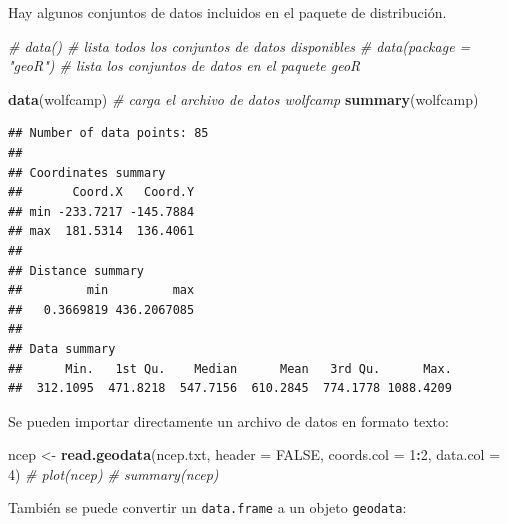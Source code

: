 \documentclass[
]{book}
\newenvironment{Shaded}{\begin{snugshade}}{\end{snugshade}}
\newcommand{\AttributeTok}[1]{\textcolor[rgb]{0.13,0.29,0.53}{#1}}
\newcommand{\CommentTok}[1]{\textcolor[rgb]{0.56,0.35,0.01}{\textit{#1}}}
\newcommand{\ConstantTok}[1]{\textcolor[rgb]{0.56,0.35,0.01}{#1}}
\newcommand{\DecValTok}[1]{\textcolor[rgb]{0.00,0.00,0.81}{#1}}
\newcommand{\FunctionTok}[1]{\textcolor[rgb]{0.13,0.29,0.53}{\textbf{#1}}}
\newcommand{\NormalTok}[1]{#1}
\newcommand{\OtherTok}[1]{\textcolor[rgb]{0.56,0.35,0.01}{#1}}
\newcommand{\SpecialCharTok}[1]{\textcolor[rgb]{0.81,0.36,0.00}{\textbf{#1}}}
\newcommand{\StringTok}[1]{\textcolor[rgb]{0.31,0.60,0.02}{#1}}
\theoremstyle{break}
\theoremstyle{definition}
\theoremstyle{definition}
\theoremstyle{definition}
\theoremstyle{definition}
\theoremstyle{remark}
\begin{document}
Hay algunos conjuntos de datos incluidos en el paquete de distribución.

\begin{Shaded}
\begin{Highlighting}[]
\CommentTok{\# data()                    \# lista todos los conjuntos de datos disponibles}
\CommentTok{\# data(package = "geoR")    \# lista los conjuntos de datos en el paquete geoR}

\FunctionTok{data}\NormalTok{(wolfcamp)              }\CommentTok{\# carga el archivo de datos wolfcamp}
\FunctionTok{summary}\NormalTok{(wolfcamp)}
\end{Highlighting}
\end{Shaded}

\begin{verbatim}
## Number of data points: 85 
## 
## Coordinates summary
##       Coord.X   Coord.Y
## min -233.7217 -145.7884
## max  181.5314  136.4061
## 
## Distance summary
##         min         max 
##   0.3669819 436.2067085 
## 
## Data summary
##      Min.   1st Qu.    Median      Mean   3rd Qu.      Max. 
##  312.1095  471.8218  547.7156  610.2845  774.1778 1088.4209
\end{verbatim}

Se pueden importar directamente un archivo de datos en formato texto:

\begin{Shaded}
\begin{Highlighting}[]
\NormalTok{ncep }\OtherTok{\textless{}{-}} \FunctionTok{read.geodata}\NormalTok{(}\StringTok{\textquotesingle{}ncep.txt\textquotesingle{}}\NormalTok{, }\AttributeTok{header =} \ConstantTok{FALSE}\NormalTok{, }\AttributeTok{coords.col =} \DecValTok{1}\SpecialCharTok{:}\DecValTok{2}\NormalTok{, }\AttributeTok{data.col =} \DecValTok{4}\NormalTok{)}
\CommentTok{\# plot(ncep)}
\CommentTok{\# summary(ncep)}
\end{Highlighting}
\end{Shaded}

También se puede convertir un \texttt{data.frame} a un objeto \texttt{geodata}:
\end{document}
